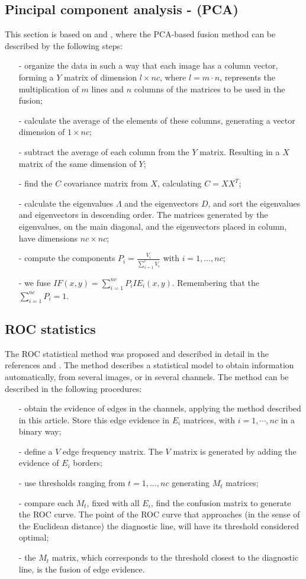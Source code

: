 \documentclass[conference]{IEEEtran}
\begin{document}
{{{{\subsection{Pincipal component analysis - (PCA) }
This section is based on \cite{n_r} and \cite{mit}, where the PCA-based fusion method can be described by the following steps:
\begin{itemize}
\item[-] organize the data in such a way that each image has a column vector, forming a $Y$ matrix of dimension $l\times nc$, where $l=m\cdot n$, represents the multiplication of $m$ lines and $n$ columns of the matrices to be used in the fusion;
\item[-] calculate the average of the elements of these columns, generating a vector dimension of $1\times nc$;
\item[-] subtract the average of each column from the $Y$ matrix. Resulting in a $X$ matrix of the same dimension of $Y$; 
\item[-] find the $C$ covariance matrix from $X$, calculating $C=XX^T$;
\item[-] calculate the eigenvalues $\Lambda$ and the eigenvectors $D$, and sort the eigenvalues and eigenvectors in descending order. The matrices generated by the eigenvalues, on the main diagonal, and the eigenvectors placed in column, have dimensions $nc\times nc$;
\item[-] compute the components $P_i=\frac{V_i}{\sum_{i=1}^l V_i}$ with $i=1,\dots,nc$;
\item[-] we fuse $IF(x,y)=\sum_{i=1}^{nc}P_iIE_i(x,y)$. Remembering that the $\sum_{i=1}^{nc}P_i=1$.
\end{itemize}

\subsection{ROC statistics}
The ROC statistical method was proposed and described in detail in the references \cite{gs} and \cite{fawcett}. The method describes a statistical model to obtain information automatically, from several images, or in several channels. The method can be described in the following procedures:
\begin{itemize}
\item[-] obtain the evidence of edges in the channels, applying the method described in this article. Store this edge evidence in $E_i$ matrices, with $i=1,\cdots,nc$ in a binary way;
\item[-] define a $V$ edge frequency matrix. The $V$ matrix is generated by adding the evidence of $E_i$ borders;
\item[-] use thresholds ranging from $t=1,\dots,nc$ generating $M_t$ matrices;
\item[-] compare each $M_t$, fixed with all $E_i$, find the confusion matrix to generate the ROC curve. The point of the ROC curve that approaches (in the sense of the Euclidean distance) the diagnostic line, will have its threshold considered optimal;
\item[-] the $M_t$ matrix, which corresponds to the threshold closest to the diagnostic line, is the fusion of edge evidence.
\end{itemize}

}}}}
\end{document}
